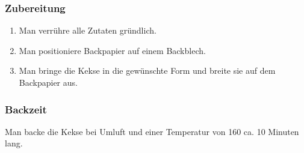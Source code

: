 \documentclass[a4paper]{book}
\begin{document}
\subsubsection{Zubereitung}

\begin{enumerate}[(1)]
	\item Man verrühre alle Zutaten gründlich.
	\item Man positioniere Backpapier auf einem Backblech.
	\item Man bringe die Kekse in die gewünschte Form und breite sie auf dem Backpapier aus.
\end{enumerate}
\subsubsection{Backzeit}
	Man backe die Kekse bei Umluft und einer Temperatur von 160{\textcelsius} ca. 10 Minuten lang.
\end{document}
